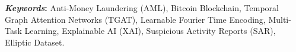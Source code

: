 \vspace{0.5cm}
\textbf{\textit{Keywords}:} Anti-Money Laundering (AML), Bitcoin Blockchain, Temporal Graph Attention Networks (TGAT), Learnable Fourier Time Encoding, Multi-Task Learning, Explainable AI (XAI), Suspicious Activity Reports (SAR), Elliptic Dataset.

\clearpage %
